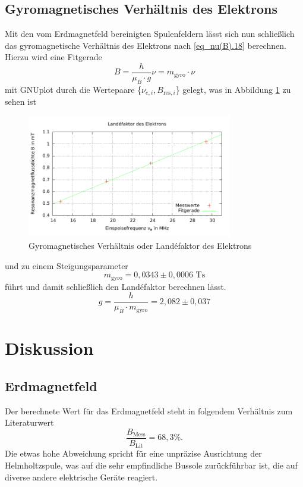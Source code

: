 \subsection{Gyromagnetisches Verhältnis des Elektrons}
Mit den vom Erdmagnetfeld bereinigten Spulenfeldern lässt sich nun schließlich das gyromagnetische Verhältnis des Elektrons nach \eqref{eq_nu(B).18}
berechnen. Hierzu wird eine Fitgerade 
\begin{equation}
 B = \frac{h}{\mu_B \cdot g} \nu = m_\text{gyro} \cdot \nu
\end{equation}
mit GNUplot durch die Wertepaare \{$\nu_{e,i},B_{\text{res},i}$\} gelegt, was in Abbildung \ref{pic_gyro} zu sehen ist
\begin{figure}[H]
\includegraphics[width=0.8\textwidth]{../pics/landefaktor.pdf}
\caption{Gyromagnetisches Verhältnis oder Landéfaktor des Elektrons}
\label{pic_gyro}
\end{figure}
\noindent und zu einem Steigungsparameter 
\begin{equation}
m_\text{gyro} = 0,0343 \pm 0,0006 \text{ Ts}
\end{equation}
führt und damit schließlich den Landéfaktor berechnen lässt.
\begin{equation}
 g = \frac{h}{\mu_B\cdot m_\text{gyro}} = 2,082 \pm 0,037
\end{equation}


\section{Diskussion}
\subsection{Erdmagnetfeld}
Der berechnete Wert für das Erdmagnetfeld steht in folgendem Verhältnis zum Literaturwert \cite{ErdB}
\begin{equation}
 \frac{B_\text{Mess}}{B_\text{Lit}} = 68,3 \%.
\end{equation}
Die etwas hohe Abweichung spricht für eine unpräzise Ausrichtung der Helmholtzspule, was auf die sehr empfindliche Bussole zurückführbar ist, die
auf diverse andere elektrische Geräte reagiert.

